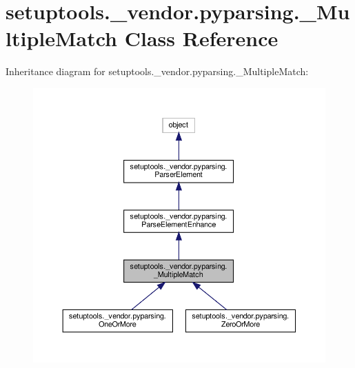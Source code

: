 \hypertarget{classsetuptools_1_1__vendor_1_1pyparsing_1_1__MultipleMatch}{}\section{setuptools.\+\_\+vendor.\+pyparsing.\+\_\+\+Multiple\+Match Class Reference}
\label{classsetuptools_1_1__vendor_1_1pyparsing_1_1__MultipleMatch}


Inheritance diagram for setuptools.\+\_\+vendor.\+pyparsing.\+\_\+\+Multiple\+Match\+:
\nopagebreak
\begin{figure}[H]
\begin{center}
\leavevmode
\includegraphics[width=350pt]{classsetuptools_1_1__vendor_1_1pyparsing_1_1__MultipleMatch__inherit__graph}
\end{center}
\end{figure}


